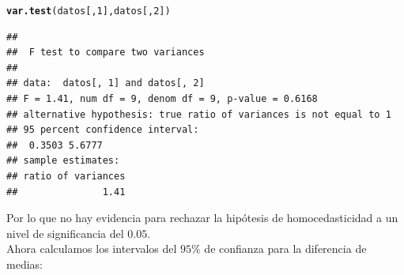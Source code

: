 \documentclass[a4paper]{scrartcl}\usepackage[]{graphicx}\usepackage[]{color}
\makeatletter
\newcommand{\hlnum}[1]{\textcolor[rgb]{0.686,0.059,0.569}{#1}}%
\newcommand{\hlstd}[1]{\textcolor[rgb]{0.345,0.345,0.345}{#1}}%
\newcommand{\hlkwd}[1]{\textcolor[rgb]{0.737,0.353,0.396}{\textbf{#1}}}%
\newenvironment{kframe}{%
 \def\at@end@of@kframe{}%
 \ifinner\ifhmode%
  \def\at@end@of@kframe{\end{minipage}}%
  \begin{minipage}{\columnwidth}%
 \fi\fi%
 \def\FrameCommand##1{\hskip\@totalleftmargin \hskip-\fboxsep
 \colorbox{shadecolor}{##1}\hskip-\fboxsep
     \hskip-\linewidth \hskip-\@totalleftmargin \hskip\columnwidth}%
 \MakeFramed {\advance\hsize-\width
   \@totalleftmargin\z@ \linewidth\hsize
   \@setminipage}}%
 {\par\unskip\endMakeFramed%
 \at@end@of@kframe}
\newenvironment{knitrout}{}{} %
\makeatother
\begin{document}
\begin{knitrout}
\color{fgcolor}\begin{kframe}
\begin{alltt}
\hlkwd{var.test}\hlstd{(datos[,} \hlnum{1}\hlstd{], datos[,} \hlnum{2}\hlstd{])}
\end{alltt}
\begin{verbatim}
## 
## 	F test to compare two variances
## 
## data:  datos[, 1] and datos[, 2]
## F = 1.41, num df = 9, denom df = 9, p-value = 0.6168
## alternative hypothesis: true ratio of variances is not equal to 1
## 95 percent confidence interval:
##  0.3503 5.6777
## sample estimates:
## ratio of variances 
##               1.41
\end{verbatim}
\end{kframe}
\end{knitrout}

\noindent Por lo que no hay evidencia para rechazar la hipótesis de homocedasticidad a un nivel de significancia del $0.05$.\\

\noindent Ahora calculamos los intervalos del $95\%$ de confianza para la diferencia de medias:
\end{document}
